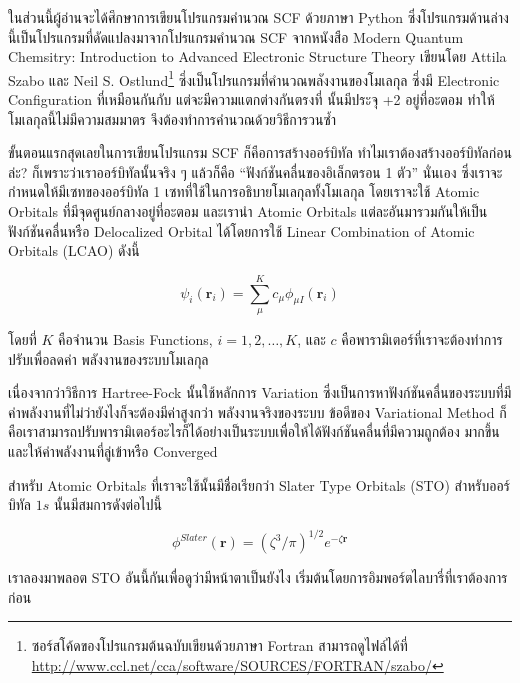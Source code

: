ในส่วนนี้ผู้อ่านจะได้ศึกษาการเขียนโปรแกรมคำนวณ SCF ด้วยภาษา Python ซึ่งโปรแกรมด้านล่างนี้เป็นโปรแกรมที่ดัดแปลงมาจากโปรแกรมคำนวณ
SCF จากหนังสือ Modern Quantum Chemsitry: Introduction to Advanced Electronic Structure Theory เขียนโดย Attila Szabo
และ Neil S. Ostlund\footnote{ซอร์สโค้ดของโปรแกรมต้นฉบับเขียนด้วยภาษา Fortran สามารถดูไฟล์ได้ที่
  \url{http://www.ccl.net/cca/software/SOURCES/FORTRAN/szabo/}} ซึ่งเป็นโปรแกรมที่คำนวณพลังงานของโมเลกุล 
ซึ่งมี Electronic Configuration ที่เหมือนกันกับ  แต่จะมีความแตกต่างกันตรงที่  นั้นมีประจุ +2 อยู่ที่อะตอม
 ทำให้โมเลกุลนี้ไม่มีความสมมาตร จึงต้องทำการคำนวณด้วยวิธีการวนซ้ำ


\noindent {}

ขั้นตอนแรกสุดเลยในการเขียนโปรแกรม SCF ก็คือการสร้างออร์บิทัล ทำไมเราต้องสร้างออร์บิทัลก่อนล่ะ? ก็เพราะว่าเราออร์บิทัลนั้นจริง ๆ แล้วก็คือ
\enquote{ฟังก์ชันคลื่นของอิเล็กตรอน 1 ตัว} นั่นเอง ซึ่งเราจะกำหนดให้มีเซทของออร์บิทัล 1 เซทที่ใช้ในการอธิบายโมเลกุลทั้งโมเลกุล โดยเราจะใช้
Atomic Orbitals ที่มีจุดศูนย์กลางอยู่ที่อะตอม และเรานำ Atomic Orbitals แต่ละอันมารวมกันให้เป็นฟังก์ชันคลื่นหรือ Delocalized Orbital
ได้โดยการใช้ Linear Combination of Atomic Orbitals (LCAO) ดังนี้

\begin{equation}
  \psi_i(\boldsymbol{r}_i)
  =
  \sum^{K}_{\mu} c_{\mu} \phi_{\mu I}(\boldsymbol{r}_i)
\end{equation}

\noindent โดยที่ $K$ คือจำนวน Basis Functions, $i = 1, 2, \dots, K$, และ $c$ คือพารามิเตอร์ที่เราจะต้องทำการปรับเพื่อลดค่า%
พลังงานของระบบโมเลกุล

เนื่องจากว่าวิธีการ Hartree-Fock นั้นใช้หลักการ Variation ซึ่งเป็นการหาฟังก์ชันคลื่นของระบบที่มีค่าพลังงานที่ไม่ว่ายังไงก็จะต้องมีค่าสูงกว่า%
พลังงานจริงของระบบ ข้อดีของ Variational Method ก็คือเราสามารถปรับพารามิเตอร์อะไรก็ได้อย่างเป็นระบบเพื่อให้ได้ฟังก์ชันคลื่นที่มีความถูกต้อง%
มากขึ้นและให้ค่าพลังงานที่ลู่เข้าหรือ Converged

สำหรับ Atomic Orbitals ที่เราจะใช้นั้นมีชื่อเรียกว่า Slater Type Orbitals (STO) สำหรับออร์บิทัล $1s$ นั้นมีสมการดังต่อไปนี้

\begin{equation}
  \phi^{Slater}\left( \boldsymbol{r}\right)
  =
  \left( \zeta^3/\pi \right)^{1/2}e^{-\zeta \boldsymbol{r}}
\end{equation}

\noindent เราลองมาพลอต STO อันนี้กันเพื่อดูว่ามีหน้าตาเป็นยังไง เริ่มต้นโดยการอิมพอร์ตไลบารี่ที่เราต้องการก่อน

